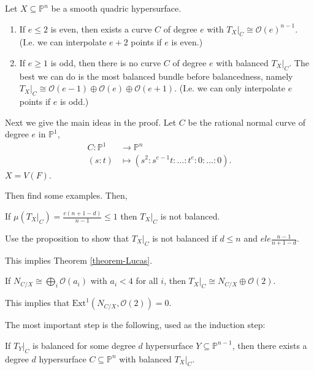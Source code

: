 \begin{theorem}
\label{theorem-lucas2}
Let $X \subseteq \mathbb{P}^n$ be a smooth
quadric hypersurface.

\begin{enumerate}
\item If $e \leq 2$ is even,
then exists a curve $C$ of degree $e$
with $T_X|_{C}\cong \mathcal{O}(e)^{n-1}$.
(I.e. we can interpolate $e+2$ points
if $e$ is even.)

\item If $e \geq 1$ is odd,
then there is no curve $C$ of degree $e$
with balanced $T_X|_C$.
The best we can do is the most balanced
bundle
before balancedness, namely
$T_X|_C \cong
\mathcal{O}(e-1)\oplus\mathcal{O}(e)
\oplus\mathcal{O}(e+1)$.
(I.e. we can only interpolate $e$ points if
$e$ is odd.)
\end{enumerate}
\end{theorem}

Next we give the main ideas in the proof.
Let $C$ be the rational normal curve
of degree $e$ in $\mathbb{P}^1$,
$$
\begin{aligned}
C:\mathbb{P}^1  &\longrightarrow \mathbb{P}^n
\\
(s:t) &\longmapsto
(s^2:s^{e-1}t:\ldots:t^e:0:\ldots:0).
\end{aligned}
$$
$X=V(F)$.

Then find some examples. Then,

\begin{proposition}
\label{proposition-proposition}
If $\mu(T_X|_{C})=\frac{e(n+1-d)}{n-1}\leq 1$
then $T_X|_{C}$ is not balanced.
\end{proposition}

\noindent
Use the proposition to show that $T_X|_C$
is not balanced if $d \leq  n$
and $e le \frac{ n-1}{n+1-d}$.

This implies Theorem \ref{theorem-Lucas}.

\begin{lemma}
\label{lemma-split-normal-bundle}
If $N_{C/X}\cong \bigoplus_i
\mathcal{O}(a_i)$
with $a_i < 4$ for all $i$,
then $T_{X}|_C \cong N_{C/X} \oplus
\mathcal{O}(2)$.
\end{lemma}

\noindent
This implies that
$\text{Ext}^1(N_{C/X},\mathcal{O}(2))=0$.

The most important step is the following,
used as the induction step:

\begin{proposition}
\label{proposition-induction}
If $T_Y|_C$ is balanced for some degree $d$
hypersurface $Y \subseteq \mathbb{P}^{n-1}$,
then there exists a degree $d$ hypersurface
$C \subseteq \mathbb{P}^n$ with balanced
$T_X|_C$.
\end{proposition}

